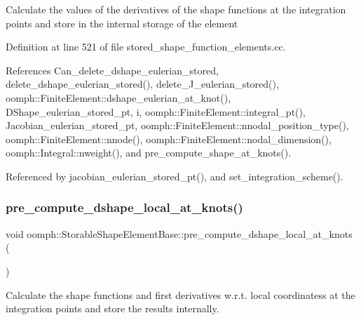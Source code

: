 Calculate the values of the derivatives of the shape functions at the integration points and store in the internal storage of the element 

Definition at line 521 of file stored\+\_\+shape\+\_\+function\+\_\+elements.\+cc.



References Can\+\_\+delete\+\_\+dshape\+\_\+eulerian\+\_\+stored, delete\+\_\+dshape\+\_\+eulerian\+\_\+stored(), delete\+\_\+\+J\+\_\+eulerian\+\_\+stored(), oomph\+::\+Finite\+Element\+::dshape\+\_\+eulerian\+\_\+at\+\_\+knot(), D\+Shape\+\_\+eulerian\+\_\+stored\+\_\+pt, i, oomph\+::\+Finite\+Element\+::integral\+\_\+pt(), Jacobian\+\_\+eulerian\+\_\+stored\+\_\+pt, oomph\+::\+Finite\+Element\+::nnodal\+\_\+position\+\_\+type(), oomph\+::\+Finite\+Element\+::nnode(), oomph\+::\+Finite\+Element\+::nodal\+\_\+dimension(), oomph\+::\+Integral\+::nweight(), and pre\+\_\+compute\+\_\+shape\+\_\+at\+\_\+knots().



Referenced by jacobian\+\_\+eulerian\+\_\+stored\+\_\+pt(), and set\+\_\+integration\+\_\+scheme().

\mbox{\label{classoomph_1_1StorableShapeElementBase_abbf221cfb9427bfc9af29233ef228b48}} 
\subsubsection{\texorpdfstring{pre\+\_\+compute\+\_\+dshape\+\_\+local\+\_\+at\+\_\+knots()}{pre\_compute\_dshape\_local\_at\_knots()}}
{\footnotesize\ttfamily void oomph\+::\+Storable\+Shape\+Element\+Base\+::pre\+\_\+compute\+\_\+dshape\+\_\+local\+\_\+at\+\_\+knots (\begin{DoxyParamCaption}{ }\end{DoxyParamCaption})}



Calculate the shape functions and first derivatives w.\+r.\+t. local coordinatess at the integration points and store the results internally. 


